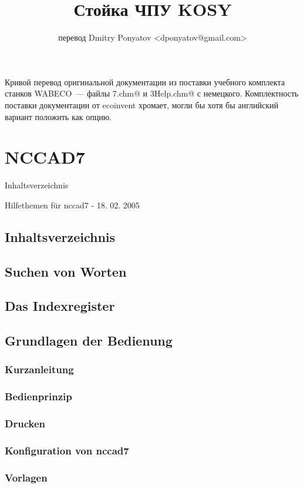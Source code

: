 \documentclass[a5paper]{book}
\title{Стойка ЧПУ KOSY}
\author{перевод Dmitry Ponyatov <dponyatov@gmail.com>}
\begin{document}
\maketitle

Кривой перевод оригинальной документации из поставки учебного комплекта станков
WABECO~--- файлы \verb@nccad7.chm@ и \verb@ZSE3Help.chm@ с немецкого.
Комплектность поставки документации от ecoinvent хромает, могли бы хотя бы
английский вариант положить как опцию.

\tableofcontents

\part{NCCAD7}

Inhaltsverzeichnis

\bigskip

Hilfethemen für nccad7 - 18. 02. 2005

\bigskip

\chapter{Inhaltsverzeichnis} 
\chapter{Suchen von Worten} 
\chapter{Das Indexregister} 
\chapter{Grundlagen der Bedienung} 
	\section{Kurzanleitung}
	\section{Bedienprinzip}
	\section{Drucken}
	\section{Konfiguration von nccad7}
	\section{Vorlagen}
\end{document}
